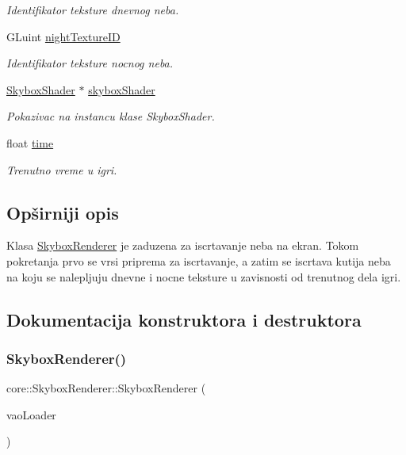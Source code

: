 \begin{DoxyCompactItemize}
\begin{DoxyCompactList}\small\item\em Identifikator teksture dnevnog neba. \end{DoxyCompactList}\item 
G\+Luint \hyperlink{classcore_1_1SkyboxRenderer_a4284f49fcad25e10008ba656eb55037d}{night\+Texture\+ID}
\begin{DoxyCompactList}\small\item\em Identifikator teksture nocnog neba. \end{DoxyCompactList}\item 
\hyperlink{classshader_1_1SkyboxShader}{Skybox\+Shader} $\ast$ \hyperlink{classcore_1_1SkyboxRenderer_abaf903d3d4e235215d0252b3e2693ad8}{skybox\+Shader}
\begin{DoxyCompactList}\small\item\em Pokazivac na instancu klase Skybox\+Shader. \end{DoxyCompactList}\item 
float \hyperlink{classcore_1_1SkyboxRenderer_a399f6a16f9c5778419942ae35a0d3e82}{time}
\begin{DoxyCompactList}\small\item\em Trenutno vreme u igri. \end{DoxyCompactList}\end{DoxyCompactItemize}


\subsection{Opširniji opis}
Klasa \hyperlink{classcore_1_1SkyboxRenderer}{Skybox\+Renderer} je zaduzena za iscrtavanje neba na ekran. Tokom pokretanja prvo se vrsi priprema za iscrtavanje, a zatim se iscrtava kutija neba na koju se nalepljuju dnevne i nocne teksture u zavisnosti od trenutnog dela igri. 

\subsection{Dokumentacija konstruktora i destruktora}
\mbox{\label{classcore_1_1SkyboxRenderer_a2b7e44e90391374f8583c2143a6b1e25}} 
\subsubsection{\texorpdfstring{Skybox\+Renderer()}{SkyboxRenderer()}}
{\footnotesize\ttfamily core\+::\+Skybox\+Renderer\+::\+Skybox\+Renderer (\begin{DoxyParamCaption}\item[{\hyperlink{classcore_1_1VaoLoader}{Vao\+Loader} $\ast$}]{vao\+Loader }\end{DoxyParamCaption})}



